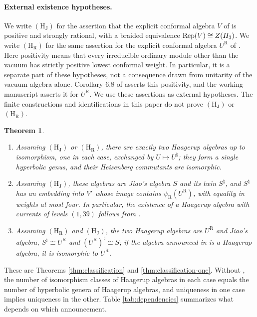 \documentclass[leqno]{article}
\let\cal\relax
\newcommand{\cal}{\mathcal}
\DeclareMathOperator{\Rep}{Rep}
\newtheorem{thm}{Theorem}[section]
\numberwithin{equation}{section}
\begin{document}
\paragraph{External existence hypotheses.}\label{par:external-hypotheses}
We write $\mathrm{(H_J)}$ for the assertion that the explicit conformal algebra $V$ of \cite{Jia26} is positive and strongly rational, with a braided equivalence $\Rep(V) \cong Z(\cal H_3)$. We write $\mathrm{(H_R)}$ for the same assertion for the explicit conformal algebra $U^{\mathrm R}$ of \cite{Rie26}. Here positivity means that every irreducible ordinary module other than the vacuum has strictly positive lowest conformal weight. In particular, it is a separate part of these hypotheses, not a consequence drawn from unitarity of the vacuum algebra alone. Corollary 6.8 of \cite{Jia26} asserts this positivity, and the working manuscript \cite[Section 11.1]{Rie26b} asserts it for $U^{\mathrm R}$. We use these assertions as external hypotheses. The finite constructions and identifications in this paper do not prove $\mathrm{(H_J)}$ or $\mathrm{(H_R)}$.

\begin{thm}
\label{thm:intro-classification}
\begin{enumerate}
\item Assuming $\mathrm{(H_J)}$ or $\mathrm{(H_R)}$, there are exactly two Haagerup algebras up to isomorphism, one in each case, exchanged by $U \mapsto U^\natural$; they form a single hyperbolic genus, and their Heisenberg commutants are isomorphic.
\item Assuming $\mathrm{(H_J)}$, these algebras are Jiao's algebra $S$ and its twin $S^\natural$, and $S^\natural$ has an embedding into $V'$ whose image contains $\psi_{\mathrm R}(U^{\mathrm R})$, with equality in weights at most four. In particular, the existence of a Haagerup algebra with currents of levels $(1,39)$ follows from \cite{Jia26}.
\item Assuming $\mathrm{(H_R)}$ and $\mathrm{(H_J)}$, the two Haagerup algebras are $U^{\mathrm R}$ and Jiao's algebra, $S^\natural \cong U^{\mathrm R}$ and $(U^{\mathrm R})^\natural \cong S$; if the algebra announced in \cite{Hua26} is a Haagerup algebra, it is isomorphic to $U^{\mathrm R}$.
\end{enumerate}
\end{thm}

These are Theorems \ref{thm:classification} and \ref{thm:classification-one}. Without \cite{Jia26,Rie26}, the number of isomorphism classes of Haagerup algebras in each case equals the number of hyperbolic genera of Haagerup algebras, and uniqueness in one case implies uniqueness in the other. Table \ref{tab:dependencies} summarizes what depends on which announcement.
\end{document}
